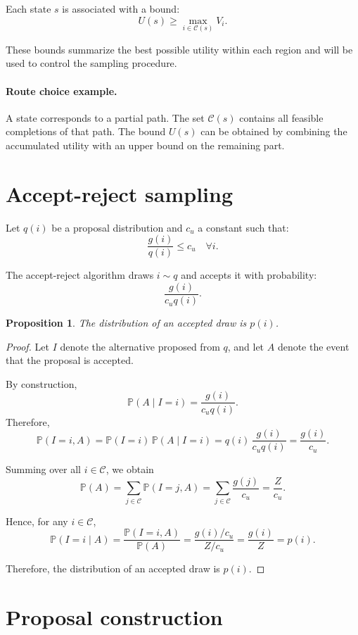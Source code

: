 \documentclass[11pt]{article}
\newtheorem{proposition}{Proposition}
\begin{document}
Each state $s$ is associated with a bound:
\[
U(s) \ge \max_{i \in \mathcal{C}(s)} V_i.
\]

These bounds summarize the best possible utility within each region and will be used to control the sampling procedure.

\paragraph{Route choice example.}
A state corresponds to a partial path. The set $\mathcal{C}(s)$ contains all feasible completions of that path. The bound $U(s)$ can be obtained by combining the accumulated utility with an upper bound on the remaining part.

\section{Accept-reject sampling}

Let $q(i)$ be a proposal distribution and $c_u$ a constant such that:
\[
\frac{g(i)}{q(i)} \le c_u \quad \forall i.
\]

The accept-reject algorithm draws $i \sim q$ and accepts it with probability:
\[
\frac{g(i)}{c_u q(i)}.
\]

\begin{proposition}
The distribution of an accepted draw is $p(i)$.
\end{proposition}

\begin{proof}
Let $I$ denote the alternative proposed from $q$, and let $A$ denote the event that the proposal is accepted.

By construction,
\[
\mathbb{P}(A \mid I=i)=\frac{g(i)}{c_u q(i)}.
\]
Therefore,
\[
\mathbb{P}(I=i, A)
=
\mathbb{P}(I=i)\,\mathbb{P}(A \mid I=i)
=
q(i)\,\frac{g(i)}{c_u q(i)}
=
\frac{g(i)}{c_u}.
\]

Summing over all $i \in \mathcal{C}$, we obtain
\[
\mathbb{P}(A)
=
\sum_{j \in \mathcal{C}} \mathbb{P}(I=j, A)
=
\sum_{j \in \mathcal{C}} \frac{g(j)}{c_u}
=
\frac{Z}{c_u}.
\]

Hence, for any $i \in \mathcal{C}$,
\[
\mathbb{P}(I=i \mid A)
=
\frac{\mathbb{P}(I=i, A)}{\mathbb{P}(A)}
=
\frac{g(i)/c_u}{Z/c_u}
=
\frac{g(i)}{Z}
=
p(i).
\]

Therefore, the distribution of an accepted draw is $p(i)$.
\end{proof}

\section{Proposal construction}
\end{document}
